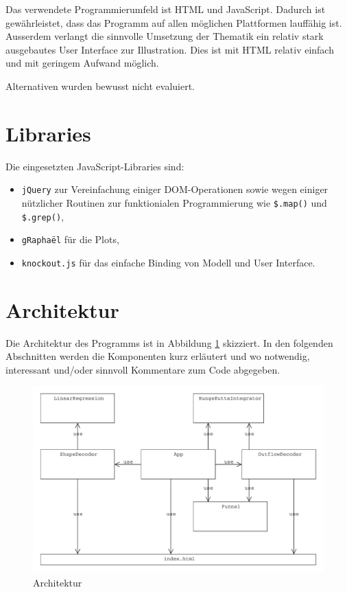 \documentclass[11pt]{scrreprt} %
\theoremstyle{definition}
\begin{document}
Das verwendete Programmierumfeld ist HTML und JavaScript. Dadurch ist gewährleistet, dass das Programm auf allen möglichen Plattformen lauffähig ist. Ausserdem verlangt die sinnvolle Umsetzung der Thematik ein relativ stark ausgebautes User Interface zur Illustration. Dies ist mit HTML relativ einfach und mit geringem Aufwand möglich.

Alternativen wurden bewusst nicht evaluiert.

\section{Libraries}

Die eingesetzten JavaScript-Libraries sind:
\begin{itemize}
\item {\tt jQuery} \cite{lib:jquery} zur Vereinfachung einiger DOM-Operationen sowie wegen einiger nützlicher Routinen zur funktionialen Programmierung wie {\tt \$.map()} und {\tt \$.grep()},
\item {\tt gRaphaël} \cite{lib:graphael} für die Plots,
\item {\tt knockout.js} \cite{lib:knockout} für das einfache Binding von Modell und User Interface.
\end{itemize}

\section{Architektur}

Die Architektur des Programms ist in Abbildung \ref{architecture} skizziert. In den folgenden Abschnitten werden die Komponenten kurz erläutert und wo notwendig, interessant und/oder sinnvoll Kommentare zum Code abgegeben.

\begin{figure}
\caption{Architektur}
\label{architecture}
\begin{center}
\includegraphics[scale=0.5]{biltli/architecture.pdf}
\end{center}
\end{figure}
\end{document}
